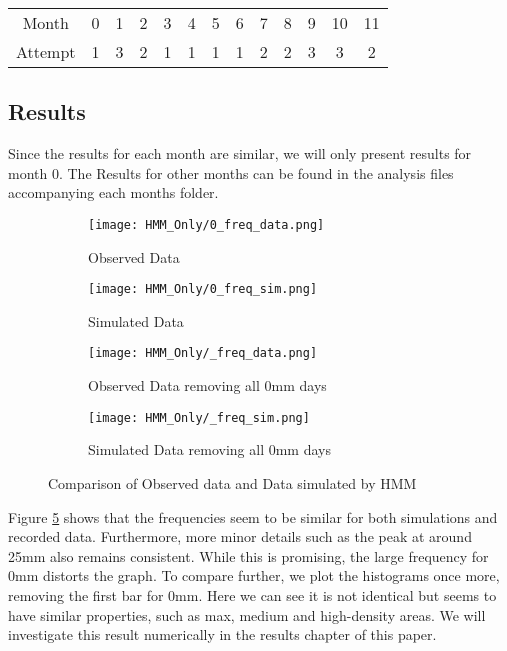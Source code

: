     \begin{center}
    \begin{tabular}{c c c c c c c c c c c c c}
        Month   &  0  & 1 & 2 & 3 & 4 & 5 & 6 & 7 & 8 & 9 & 10 & 11 \\
        Attempt &  1  & 3 & 2 & 1 & 1 & 1 & 1 & 2 & 2 & 3 & 3  & 2 
    \end{tabular}  
    \end{center}

    \subsection{Results}
    \label{Simple_Rainfall_HMM:Analysis:Resutls}

    Since the results for each month are similar, we will only present results for month 0. The Results for other months can be found in the analysis files accompanying each months folder. 

    \begin{figure}
        \begin{subfigure}{.45\textwidth}
        \centering
        \texttt{[image: HMM\_Only/0\_freq\_data.png]}
        \caption{Observed Data}
        \label{inc0:data}
        \end{subfigure}
        \begin{subfigure}{.45\textwidth}
        \centering
        \texttt{[image: HMM\_Only/0\_freq\_sim.png]}
        \caption{Simulated Data}
        \label{inc0:sim}
        \end{subfigure}

        \begin{subfigure}{.45\textwidth}
        \centering
        \texttt{[image: HMM\_Only/\_freq\_data.png]}
        \caption{Observed Data removing all 0mm days}
        \label{inc0:n0data}
        \end{subfigure}
        \begin{subfigure}{.45\textwidth}
        \centering
        \texttt{[image: HMM\_Only/\_freq\_sim.png]}
        \caption{Simulated Data removing all 0mm days}
        \label{inc0:n0sim}
        \end{subfigure}
        \caption{Comparison of Observed data and Data simulated by HMM}
        \label{inc0}
    \end{figure}

    Figure \ref{inc0} shows that the frequencies seem to be similar for both simulations and recorded data. Furthermore, more minor details such as the peak at around 25mm also remains consistent. While this is promising, the large frequency for 0mm distorts the graph. To compare further, we plot the histograms once more, removing the first bar for 0mm. Here we can see it is not identical but seems to have similar properties, such as max, medium and high-density areas. We will investigate this result numerically in the results chapter of this paper.


    